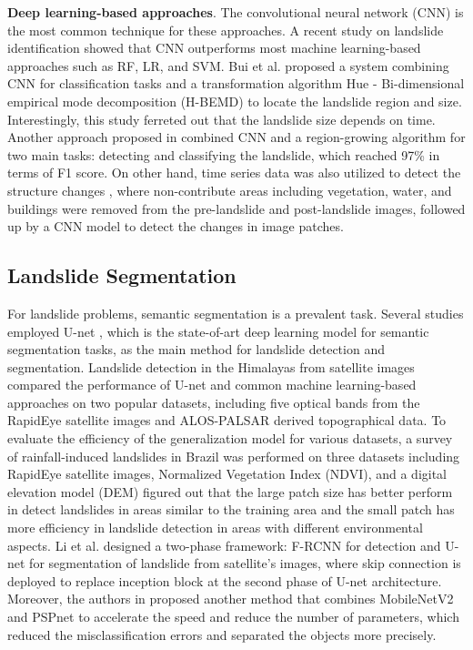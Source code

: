 \documentclass{ieeeaccess}
\begin{document}
{\bf Deep learning-based approaches}.
The convolutional neural network (CNN) is the most common technique for these approaches. A recent study on landslide identification \cite{Haojie2021} showed that CNN outperforms most machine learning-based approaches such as RF, LR, and SVM. Bui et al. \cite{TrongAn2020} proposed a system combining CNN for classification tasks and a transformation algorithm Hue - Bi-dimensional empirical mode decomposition (H-BEMD) to locate the landslide region and size. Interestingly, this study ferreted out that the landslide size depends on time. Another approach proposed in \cite{HongYu2017} combined CNN and a region-growing algorithm for two main tasks: detecting and classifying the landslide, which reached 97\% in terms of F1 score. On other hand, time series data was also utilized to detect the structure changes \cite{Anzi2016}, where non-contribute areas including vegetation, water, and buildings were removed from the pre-landslide and post-landslide images, followed up by a CNN model to detect the changes in image patches.

\subsection{Landslide Segmentation} 
For landslide problems, semantic segmentation is a prevalent task. 
Several studies employed U-net  \cite{Unet2015}, which is the state-of-art deep learning model for semantic segmentation tasks, as the main method for landslide detection and segmentation. Landslide detection in the Himalayas from satellite images \cite{Sansar2022} compared the performance of U-net and common machine learning-based approaches on two popular datasets, including five optical bands from the RapidEye satellite images and ALOS-PALSAR derived topographical data. To evaluate the efficiency of the generalization model for various datasets, a survey of rainfall-induced landslides in Brazil \cite{Lucas2022} was performed on three datasets including RapidEye satellite images, Normalized Vegetation Index (NDVI), and a digital elevation model (DEM) figured out that the large patch size has better perform in detect landslides in areas similar to the training area and the small patch has more efficiency in landslide detection in areas with different environmental aspects. Li et al. \cite{HuajinLi2022} designed a two-phase framework: F-RCNN for detection and U-net for segmentation of landslide from satellite's images, where skip connection is deployed to replace inception block at the second phase of U-net architecture. Moreover, the authors in \cite{Zhunli2020} proposed another method that combines MobileNetV2 and PSPnet to accelerate the speed and reduce the number of parameters, which reduced the misclassification errors and separated the objects more precisely.
\end{document}

